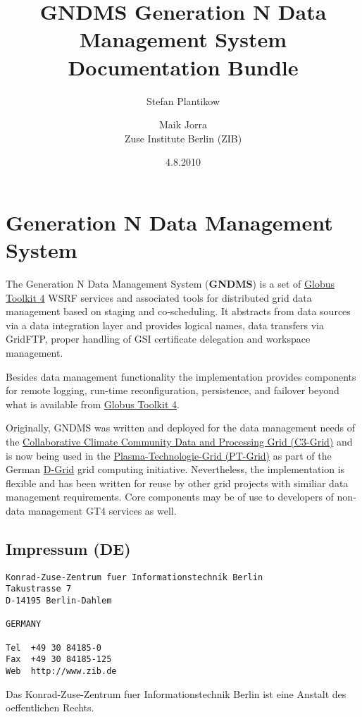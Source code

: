 \documentclass{article}
\title{GNDMS Generation N Data Management System Documentation Bundle}
\author{Stefan Plantikow \and Maik Jorra\\Zuse Institute Berlin (ZIB)}
\date{4.8.2010}
\begin{document}
\maketitle

\tableofcontents

\newpage


\section{Generation N Data Management System}

The Generation N Data Management System (\textbf{GNDMS}) is a set
of \href{http://www.globus.org}{Globus Toolkit 4} WSRF services and
associated tools for distributed grid data management based on
staging and co-scheduling. It abstracts from data sources via a
data integration layer and provides logical names, data transfers
via GridFTP, proper handling of GSI certificate delegation and
workspace management.

Besides data management functionality the implementation provides
components for remote logging, run-time reconfiguration,
persistence, and failover beyond what is available from
\href{http://www.globus.org}{Globus Toolkit 4}.

Originally, GNDMS was written and deployed for the data management
needs of the
\href{http://www.c3grid.de}{Collaborative Climate Community Data and Processing Grid (C3-Grid)}
and is now being used in the
\href{http://www.pt-grid.de}{Plasma-Technologie-Grid (PT-Grid)} as
part of the German \href{http://www.dgrid.de}{D-Grid} grid
computing initiative. Nevertheless, the implementation is flexible
and has been written for reuse by other grid projects with similiar
data management requirements. Core components may be of use to
developers of non-data management GT4 services as well.

\subsection{Impressum (DE)}

\begin{verbatim}
Konrad-Zuse-Zentrum fuer Informationstechnik Berlin
Takustrasse 7
D-14195 Berlin-Dahlem

GERMANY

Tel  +49 30 84185-0
Fax  +49 30 84185-125
Web  http://www.zib.de
\end{verbatim}

Das Konrad-Zuse-Zentrum fuer Informationstechnik Berlin ist eine Anstalt des oeffentlichen Rechts.
\end{document}
